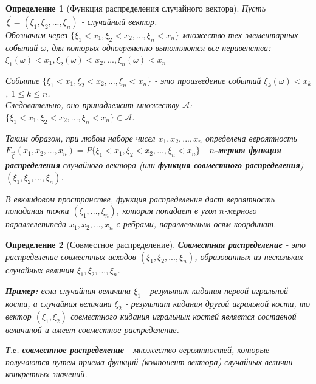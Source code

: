 \documentclass[14pt]{extarticle}
\theoremstyle{breakstyle}
\newtheorem{definition}{Определение}[subsection]
\begin{document}
\begin{definition}[Функция распределения случайного вектора]

Пусть $\vec{\xi} = (\xi_{1}, \xi_{2}, ... , \xi_{n})$ - случайный вектор. \\
Обозначим через $\{\xi_{1} < x_{1}, \xi_{2} < x_{2}, ... , \xi_{n} < x_{n}\}$ множество тех элементарных событий $\omega$, для которых одновременно выполняются все неравенства: $\xi_{1}(\omega) < x_{1}, \xi_{2}(\omega) < x_{2}, ..., \xi_{n}(\omega) < x_{n}$

\vspace{\baselineskip}

Событие $\{\xi_{1} < x_{1}, \xi_{2} < x_{2}, ... , \xi_{n} < x_{n}\}$ - это произведение событий $\xi_{k}(\omega) < x_{k}$, $1 \leq k \leq n$. \\
Следовательно, оно принадлежит множеству $\mathscr{A}$: $\{\xi_{1} < x_{1}, \xi_{2} < x_{2}, ... , \xi_{n} < x_{n}\} \in \mathscr{A}$.

\vspace{\baselineskip}

Таким образом, при любом наборе чисел $x_{1}, x_{2}, ..., x_{n}$ определена вероятность $F_{\vec{\xi}}(x_{1}, x_{2}, ..., x_{n}) = P\{\xi_{1} < x_{1}, \xi_{2} < x_{2}, ... , \xi_{n} < x_{n}\}$ - \textbf{$n$-мерная функция распределения} случайного вектора (или \textbf{функция совместного распределения}) $(\xi_{1}, \xi_{2}, ..., \xi_{n})$.

\vspace{\baselineskip}

В евклидовом пространстве, функция распределения даст вероятность попадания точки $(\xi_{1}, ..., \xi_{n})$, которая попадает в угол $n$-мерного параллелепипеда $x_{1}, x_{2}, ..., x_{n}$ с ребрами, параллельным осям координат.

\end{definition}

\begin{definition}[Совместное распределение]

\textbf{Совместная распределение} - это распределение совместных исходов $(\xi_{1}, \xi_{2}, ..., \xi_{n})$, образованных из нескольких случайных величин $\xi_{1}, \xi_{2}, ..., \xi_{n}$.

\vspace{\baselineskip}

\textbf{Пример:} если случайная величина $\xi_{1}$ - результат кидания первой игральной кости, а случайная величина $\xi_{2}$ -  результат кидания другой игральной кости, то вектор $(\xi_{1}, \xi_{2})$ совместного кидания игральных костей является составной величиной и имеет совместное распределение.

\vspace{\baselineskip}

Т.е. \textbf{совместное распределение} - множество вероятностей, которые получаются путем приема функций (компонент вектора) случайных величин конкретных значений.

\end{definition}
\end{document}
